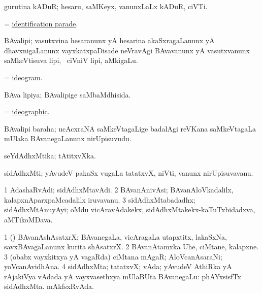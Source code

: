 \bentry
{}
\gl{\nA}
\bmng
gurutina kADuR; hesaru, saMKeyx, \mo vanunxLaLx kADuR, ciVTi. 
\emng
\eentry

\bentry
{}
\gl{\nA}
\bmng
 = \hyperlink{identification parade}{identification parade}. 
\emng
\eentry

\bentry
{}
\gl{\nA}
\bmng
BAvalipi; vasutxvina hesaranunx yA hesarina akaSxragaLanunx yA dhavxnigaLanunx vayxkatxpaDisade neVravAgi BAvavanunx yA vasutxvanunx saMkeVtisuva lipi, \udA\ ciVniV lipi, aMkigaLu. 
\emng
\eentry

\bentry
{}
\gl{\nA}
\bmng
 = \hyperlink{ideogram}{ideogram}. 
\emng
\eentry

\bentry
{}
\gl{\gu}
\bmng
BAva lipiya; BAvalipige saMbaMdhisida. 
\emng
\eentry

\bentry
{}
\gl{\gu}
\bmng
 = \hyperlink{ideographic}{ideographic}. 
\emng
\eentry

\bentry
{}
\gl{\nA}
\bmng
BAvalipi baraha; ucAcxraNA saMkeVtagaLige badalAgi reVKana saMkeVtagaLa mUlaka BAvanegaLanunx nirUpisuvudu. 
\emng
\eentry

\bentry
{}
\gl{\gu}
\bmng
seYdAdhxMtika; tAtitxvXka. 
\emng
\eentry

\bentry
{}
\gl{\nA}
\bmng
sidAdhxMti; yAvudeV pakaSx \mo vugaLa tatatxvX, niVti, \mo vanunx nirUpisuvavanu. 
\emng
\eentry

\bentry
{}
\gl{\nA}
\bmng
\bnum
\num{1} AdashaRvAdi; sidAdhxMtavAdi. 
\num{2} BAvanAnivAsi; BAvanAloVkadalilx, kalapxnAparxpaMcadalilx iruvavanu. 
\num{3} sidAdhxMtabadadhx; sidAdhxMtAnuyAyi; oMdu vicAravAdakekx, sidAdhxMtakekx-kaTuTxbidadxva, aMTikoMDava. 
\enum
\emng
\eentry

\bentry
{}
\gl{\nA}
\bmng
\bnum
\num{1} (\pArxparx) BAvanAshAsatxrX; BAvanegaLa, vicAragaLa utapxtitx, lakaSxNa, savxBAvagaLanunx kurita shAsatxrX. 
\num{2} BAvanAtamxka Uhe, ciMtane, kalapxne. 
\num{3} (obabx vayxkitxya yA vagaRda) ciMtana mAgaR; AloVcanAsaraNi; yoVcanAvidhAna. 
\num{4} sidAdhxMta; tatatxvX; vAda; yAvudeV AthiRka yA rAjakiVya vAdada yA vayxvasethxya mUlaBUta BAvanegaLu:  phAYxsisfTx sidAdhxMta.  mAkfsxRvAda. 
\enum
\emng
\eentry

